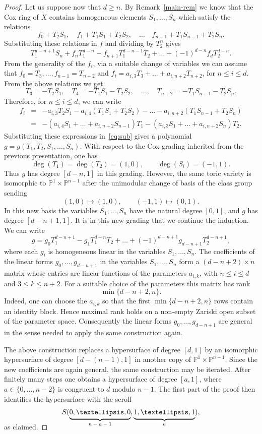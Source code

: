 \documentclass{amsart}
\newcommand\undermat[2]{%
  \makebox[0pt][l]{$\smash{\underbrace{\phantom{%
    \begin{matrix}#2\end{matrix}}}_{\text{$#1$}}}$}#2}
\theoremstyle{definition}
\theoremstyle{remark}
\begin{document}
\begin{proof}
Let us suppose now that $d\geq n$. By Remark~\ref{main-rem}
we know that the Cox ring of $X$ contains homogeneous
elements $S_1,\dots,S_n$ which satisfy the relations
\[
f_0+T_2S_1,
\quad
f_1+T_1S_1+T_2S_2,
\quad
\dots
\quad
f_{n-1} + T_1S_{n-1} + T_2S_{n}.
\]
Substituting these relations in $f$ and dividing by $T_2^n$ gives
\begin{equation}
    \label{eq:sub}
T_1^{d-n+1}S_n + f_nT_1^{d-n} - f_{n+1}T_1^{d-n-1}T_2 +\dots
+(-1)^{d-n}f_dT_2^{d-n}.
\end{equation}
From the generality of the $f_i$,
via a suitable change of variables we can assume
that $f_0 = T_3,\dots, f_{n-1} = T_{n+2}$
and $f_i = a_{i,3}T_3+\dots +a_{i,n+2}T_{n+2}$,
for $n\leq i\leq d$. From the above relations we get
\[
T_3  =  -T_2S_1,
\quad
T_4 = -T_1S_1-T_2S_2,
\quad\dots,\quad
T_{n+2} =  -T_1S_{n-1}-T_2S_n.
\]
Therefore, for $n\leq i\leq d$, we can write
\[
\begin{array}{rcl}
f_i & = & -a_{i,3}T_2S_1 - a_{i,4}(T_1S_1+T_2S_2) -\dots -
a_{i,n+2}(T_1S_{n-1}+T_2S_n)\\[2mm]
& = & -(a_{i,4}S_1+\dots+a_{i,n+2}S_{n-1})T_1
-(a_{i,3}S_1+\dots +a_{i,n+2}S_n)T_2.
\end{array}
\]
Substituting these expressions in~\eqref{eq:sub} gives a polynomial
$g=g(T_1,T_2,S_1,\dots,S_n)$.
With respect to the Cox grading inherited from the previous presentation, one has
\[
\deg(T_1)=\deg(T_2)=(1,0),
\qquad
\deg(S_i)=(-1,1).
\]
Thus $g$ has degree $[d-n,1]$ in this grading. However, the same toric variety is isomorphic to $\mathbb P^1\times\mathbb P^{n-1}$ after the unimodular change of basis of the class group sending
\[
(1,0)\mapsto (1,0),
\qquad
(-1,1)\mapsto (0,1).
\]
In this new basis the variables $S_1,\dots,S_n$ have the natural degree $[0,1]$, and $g$ has degree $[d-n+1,1]$.
It is in this new grading that we continue the induction.
We can write
\[
g = g_0T_1^{d-n+1} - g_1T_1^{d-n}T_2 +
\dots + (-1)^{d-n+1}g_{d-n+1}T_2^{d-n+1},
\]
where each $g_i$ is homogeneous linear in the variables
$S_1,\dots,S_n$. The coefficients of the linear forms
$g_0,\dots,g_{d-n+1}$ in the variables $S_1,\dots,S_n$ form a
$(d-n+2)\times n$ matrix whose entries are linear functions of the parameters
$a_{i,k}$, with $n\leq i\leq d$ and $3\leq k\leq n+2$.
For a suitable choice of the parameters this matrix has rank
\[
\min\{d-n+2,n\}.
\]
Indeed, one can choose the $a_{i,k}$ so that the first
$\min\{d-n+2,n\}$ rows contain an identity block. Hence maximal rank holds on a non-empty Zariski open subset of the parameter space. Consequently the linear forms $g_0,\dots,g_{d-n+1}$ are general in the sense needed to apply the same construction again.

The above construction replaces a hypersurface of degree $[d,1]$ by an isomorphic hypersurface of degree $[d-(n-1),1]$ in another copy of $\mathbb P^1\times\mathbb P^{n-1}$. Since the new coefficients are again general, the same construction may be iterated. After finitely many steps one obtains a hypersurface of degree $[a,1]$, where $a\in\{0,\dots,n-2\}$ is congruent to $d$ modulo $n-1$. The first part of the proof then identifies the hypersurface with the scroll
\[
S(\undermat{n-a-1}{0,\dots,0},\undermat{a}{1,\dots,1}),
\]
as claimed.
\end{proof}
\end{document}
